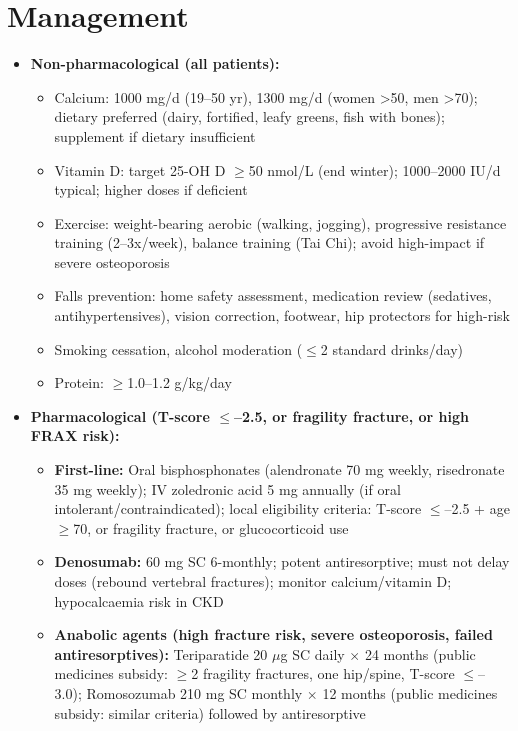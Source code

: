 \section*{Management}
\begin{itemize}
    \item \textbf{Non-pharmacological (all patients):}
    \begin{itemize}
        \item Calcium: 1000 mg/d (19--50 yr), 1300 mg/d (women >50, men >70); dietary preferred (dairy, fortified, leafy greens, fish with bones); supplement if dietary insufficient
        \item Vitamin D: target 25-OH D $\ge$50 nmol/L (end winter); 1000--2000 IU/d typical; higher doses if deficient
        \item Exercise: weight-bearing aerobic (walking, jogging), progressive resistance training (2--3x/week), balance training (Tai Chi); avoid high-impact if severe osteoporosis
        \item Falls prevention: home safety assessment, medication review (sedatives, antihypertensives), vision correction, footwear, hip protectors for high-risk
        \item Smoking cessation, alcohol moderation ($\le$2 standard drinks/day)
        \item Protein: $\ge$1.0--1.2 g/kg/day
    \end{itemize}
    \item \textbf{Pharmacological (T-score $\le$--2.5, or fragility fracture, or high FRAX risk):}
    \begin{itemize}
        \item \textbf{First-line:} Oral bisphosphonates (alendronate 70 mg weekly, risedronate 35 mg weekly); IV zoledronic acid 5 mg annually (if oral intolerant/contraindicated); local eligibility criteria: T-score $\le$--2.5 + age $\ge$70, or fragility fracture, or glucocorticoid use
        \item \textbf{Denosumab:} 60 mg SC 6-monthly; potent antiresorptive; must not delay doses (rebound vertebral fractures); monitor calcium/vitamin D; hypocalcaemia risk in CKD
        \item \textbf{Anabolic agents (high fracture risk, severe osteoporosis, failed antiresorptives):} Teriparatide 20 $\mu$g SC daily $\times$ 24 months (public medicines subsidy: $\ge$2 fragility fractures, one hip/spine, T-score $\le$--3.0); Romosozumab 210 mg SC monthly $\times$ 12 months (public medicines subsidy: similar criteria) followed by antiresorptive

\end{itemize}
\end{itemize}

